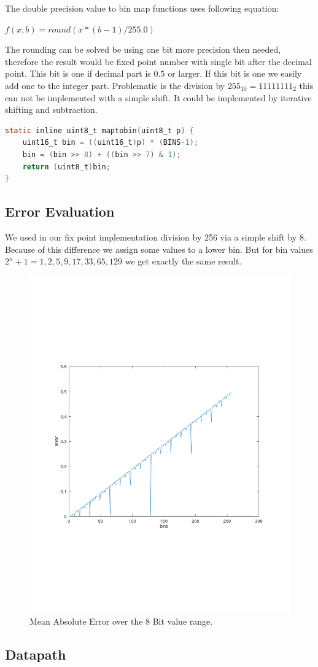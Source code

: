 \documentclass[a4paper,fontsize=12pt]{scrartcl}
\begin{document}
The double precision value to bin map functions uses following equation: 

$f(x,b) = round(x*(b-1)/255.0)$

The rounding can be solved be using one bit more precision then needed, therefore the result would be fixed point number with single bit after the decimal point. This bit is one if decimal part is $0.5$ or larger. If this bit is one we easily add one to the integer part. Problematic is the division by $255_{10}=11111111_2$ this can not be implemented with a simple shift. It could be implemented by iterative shifting and subtraction. 

\begin{minipage}{\linewidth}
\begin{lstlisting}[language=C]
static inline uint8_t maptobin(uint8_t p) {
	uint16_t bin = ((uint16_t)p) * (BINS-1);
	bin = (bin >> 8) + ((bin >> 7) & 1);
	return (uint8_t)bin;
}
\end{lstlisting}
\end{minipage}

\subsection{Error Evaluation}

We used in our fix point implementation division by 256 via a simple shift by 8. Because of this difference we assign some values to a lower bin. But for bin values $2^n+1 = {1,2,5,9,17,33,65,129}$ we get exactly the same result.
\begin{figure}[h!]
	\centering
	\includegraphics[width=0.4\linewidth]{histoerror}
	\caption{Mean Absolute Error over the 8 Bit value range.}
\end{figure}

\subsection{Datapath}
\end{document}
